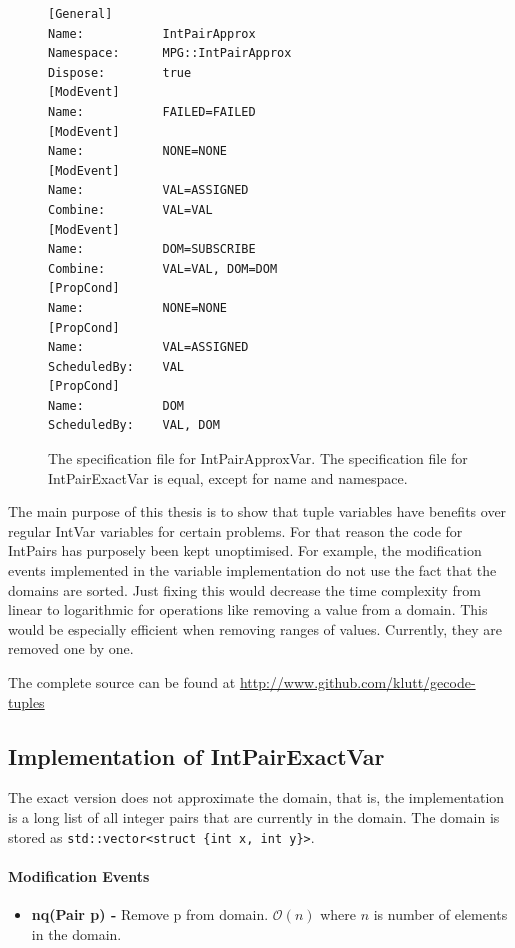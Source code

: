 \documentclass[a4paper,11pt]{article}
\begin{document}
\begin{figure}[H]
\begin{minipage}{\linewidth}
\begin{lstlisting}[frame=single]
[General]
Name:           IntPairApprox
Namespace:      MPG::IntPairApprox
Dispose:        true
[ModEvent]
Name:           FAILED=FAILED
[ModEvent]
Name:           NONE=NONE
[ModEvent]
Name:           VAL=ASSIGNED
Combine:        VAL=VAL
[ModEvent]
Name:           DOM=SUBSCRIBE
Combine:        VAL=VAL, DOM=DOM
[PropCond]
Name:           NONE=NONE
[PropCond]
Name:           VAL=ASSIGNED
ScheduledBy:    VAL
[PropCond]
Name:           DOM
ScheduledBy:    VAL, DOM
\end{lstlisting}
\end{minipage}
\caption{The specification file for IntPairApproxVar. The specification file for IntPairExactVar is equal, except for name and namespace.}
\end{figure}

The main purpose of this thesis is to show that tuple variables have benefits over regular IntVar variables for certain problems. For that reason the code for IntPairs has purposely been kept unoptimised. For example, the modification events implemented in the variable implementation do not use the fact that the domains are sorted. Just fixing this would decrease the time complexity from linear to logarithmic for operations like removing a value from a domain. This would be especially efficient when removing ranges of values. Currently, they are removed one by one.

The complete source can be found at \url{http://www.github.com/klutt/gecode-tuples}

\subsection{Implementation of IntPairExactVar}
The exact version does not approximate the domain, that is, the implementation is a long list of all integer pairs that are currently in the domain. The domain is stored as \texttt{std::vector<struct \{int x, int y\}>}. 

\paragraph{Modification Events}
\begin{itemize}
\item {\textbf{nq(Pair p) - }} Remove p from domain. $\mathcal{O}(n)$ where $n$ is number of elements in the domain.
\end{itemize}
\end{document}
